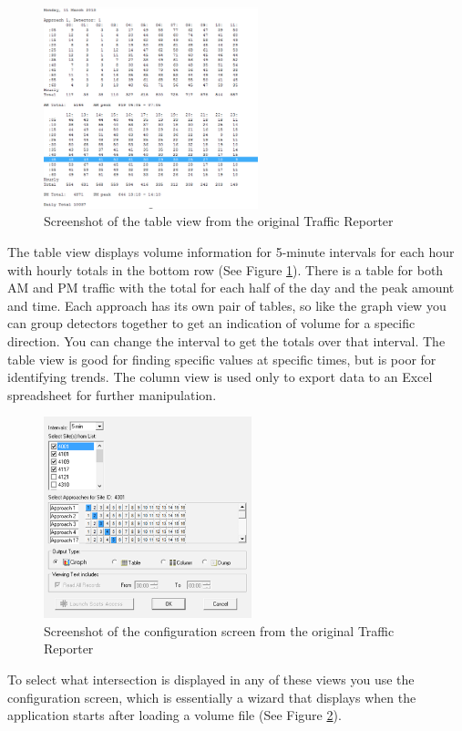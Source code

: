 \documentclass{article}
\begin{document}
\begin{figure}[!b]
\centerline{\includegraphics[height=2.3in]{oldTable}}
\caption{Screenshot of the table view from the original Traffic Reporter}
\label{fig:oldTable}
\end{figure}

The table view displays volume information for 5-minute
intervals for each hour with hourly totals in the bottom row
(See Figure \ref{fig:oldTable}). There is a table for both AM and PM traffic with
the total for each half of the day and the peak amount and
time. Each approach has its own pair of tables, so like the
graph view you can group detectors together to get an
indication of volume for a specific direction. You can change
the interval to get the totals over that interval.
The table view is good for finding specific values at
specific times, but is poor for identifying trends.
The column view is used only to export data to an Excel
spreadsheet for further manipulation.

\begin{figure}[!t]
\centerline{\includegraphics[height=2.3in]{oldConfig}}
\caption{Screenshot of the configuration screen from the original Traffic Reporter}
\label{fig:oldConfig}
\end{figure}

To select what intersection is displayed in any of these views you use the configuration screen, which is essentially a wizard that displays when the application starts after loading a volume file (See Figure \ref{fig:oldConfig}).
\end{document}
